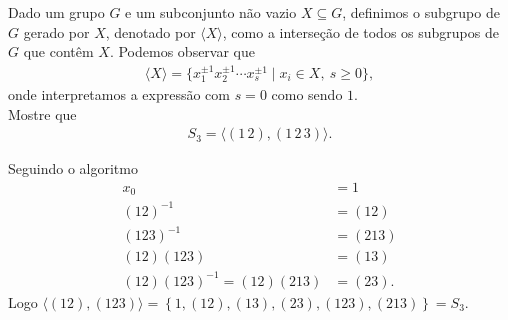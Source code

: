 \begin{homeworkProblem}
  Dado um grupo $G$ e um subconjunto não vazio $X \subseteq G$, definimos o subgrupo de $G$  gerado por $X$, denotado por $\langle X \rangle$, como a interseção de todos os subgrupos de $G$ que contêm $X$. Podemos observar que
  \begin{align*}
    \langle X \rangle = \{ x_1^{\pm1} x_2^{\pm1}\cdots x_s^{\pm1} \mid x_i \in X,\ s\ge 0 \},
  \end{align*}
  onde interpretamos a expressão com $s=0$ como sendo $1$.\\
  Mostre que
  \begin{align*} 
    S_3 = \langle (1\,2), (1\,2\,3) \rangle .
  \end{align*}
  \begin{solution}
    Seguindo o algoritmo
    \begin{align*}
      x_0&=1\\
      (12)^{-1}&=(12)\\
      (123)^{-1}&=(213)\\
      (12)(123)&=(13)\\
      (12)(123)^{-1}=(12)(213)&=(23).
    \end{align*}
    Logo $\langle (12),(123) \rangle=\left\{ 1,(12),(13),(23),(123),(213) \right\}=S_3$.
  \end{solution}
\end{homeworkProblem}
